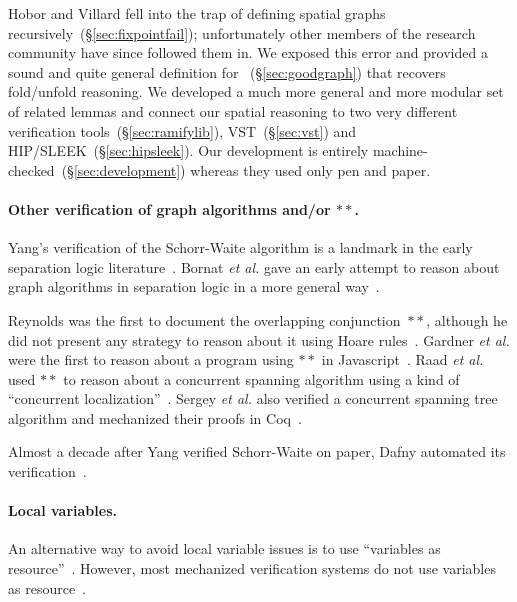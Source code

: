 Hobor and Villard fell into the trap of defining spatial graphs recursively~(\S\ref{sec:fixpointfail}); unfortunately other members of the research community have since followed them in.  We exposed this error and provided a sound and quite general definition for ~(\S\ref{sec:goodgraph}) that recovers fold/unfold reasoning.  We developed a much more general and more modular set of related lemmas and connect our spatial reasoning to two very different verification tools~(\S\ref{sec:ramifylib}), VST~(\S\ref{sec:vst}) and HIP/SLEEK~(\S\ref{sec:hipsleek}).  Our development is entirely machine-checked~(\S\ref{sec:development}) whereas they used only pen and paper.
\fi

\paragraph{Other verification of graph algorithms and/or $**$.}
Yang's verification of the Schorr-Waite algorithm is a landmark in the early separation logic literature~\cite{hongseok:phd}.  Bornat \emph{et al.} gave an early attempt to reason about graph algorithms in separation logic in a more general way~\cite{bornat:aliasing04}.

Reynolds was the first to document the overlapping conjunction~$**$, although he did not present any strategy to reason about it using Hoare rules~\cite{rey-slnotes}.  Gardner \emph{et al.} were the first to reason about a program using $**$ in Javascript~\cite{GardnerMS12}.  Raad \emph{et al.} used $**$ to reason about a concurrent spanning algorithm using a kind of ``concurrent localization''~\cite{RaadVG15}.  Sergey \emph{et al.} also verified a concurrent spanning tree algorithm and mechanized their proofs in Coq~\cite{ilya-graphs}.

Almost a decade after Yang verified Schorr-Waite on paper, Dafny automated its verification~\cite{Leino10}.

\paragraph{Local variables.}
An alternative way to avoid local variable issues is to use ``variables as resource''~\cite{bornat:var}.
However, most mechanized verification systems do not use variables as resource~\cite{Beckert:2007,DistefanoP08,chin:hipsleek,Leino10,bengtson:charge,appel:programlogics}.


